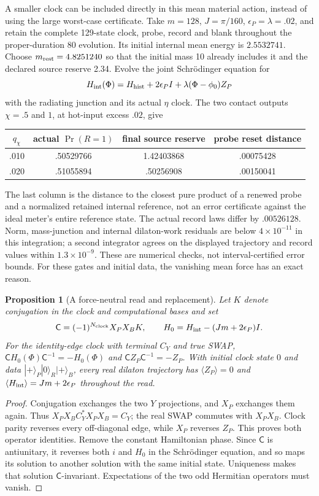 \documentclass[12pt,a4paper]{article}
\newtheorem{proposition}[theorem]{Proposition}
\begin{document}
A smaller clock can be included directly in this mean material action,
instead of using the large worst-case certificate. Take $m=128$,
$J=\pi/160$, $\epsilon_P=\lambda=.02$, and retain the complete
129-state clock, probe, record and blank throughout the proper-duration
80 evolution. Its initial internal mean energy is $2.5532741$.
Choose $m_{\rm rest}=4.8251240$ so that the initial mass 10 already
includes it and the declared source reserve 2.34. Evolve the joint
Schr\"odinger equation for
\[
 H_{\rm int}(\Phi)=H_{\rm hist}+2\epsilon_P I
                       +\lambda(\Phi-\phi_0)Z_P
\]
with the radiating junction and its actual $\eta$ clock. The two contact
outputs $\chi=.5$ and $1$, at hot-input excess $.02$, give
\begin{center}
\begin{tabular}{cccc}
\hline
$q_\chi$ & actual $\Pr(R=1)$ & final source reserve & probe reset distance\\
\hline
.010 & .50529766 & 1.42403868 & .00075428\\
.020 & .51055894 & .50256908 & .00150041\\
\hline
\end{tabular}
\end{center}
The last column is the distance to the closest pure product of a
renewed probe and a normalized retained internal reference, not an error
certificate against the ideal meter's entire reference state. The actual record
laws differ by $.00526128$. Norm, mass-junction and internal dilaton-work
residuals are below $4\times10^{-11}$ in this integration; a second
integrator agrees on the displayed trajectory and record values within
$1.3\times10^{-9}$. These are numerical checks, not interval-certified
error bounds. For these gates and initial data, the vanishing mean force
has an exact reason.

\begin{proposition}[A force-neutral read and replacement]
\label{prop:force-neutral-meter}
Let $K$ denote conjugation in the clock and computational bases and set
\[
 \mathsf C=(-1)^{N_{\rm clock}}X_PX_B K,\qquad
 H_0=H_{\rm int}-(Jm+2\epsilon_P)I.
\]
For the identity-edge clock with terminal $C_Y$ and true SWAP,
$\mathsf C H_0(\Phi)\mathsf C^{-1}=-H_0(\Phi)$ and
$\mathsf C Z_P\mathsf C^{-1}=-Z_P$.
With initial clock state $0$ and data $|+\rangle_P|0\rangle_R|+\rangle_B$,
every real dilaton trajectory has
$\langle Z_P\rangle=0$ and
$\langle H_{\rm int}\rangle=Jm+2\epsilon_P$ throughout the read.
\end{proposition}
\begin{proof}
Conjugation exchanges the two $Y$ projections, and $X_P$ exchanges
them again. Thus $X_PX_B C_Y^*X_PX_B=C_Y$; the real SWAP commutes
with $X_PX_B$. Clock parity reverses every off-diagonal edge, while
$X_P$ reverses $Z_P$. This proves both operator identities.
Remove the constant Hamiltonian phase. Since $\mathsf C$ is
antiunitary, it reverses both $i$ and $H_0$ in the Schr\"odinger
equation, and so maps its solution to another solution with the same
initial state. Uniqueness makes that solution $\mathsf C$-invariant.
Expectations of the two odd Hermitian operators must vanish.
\end{proof}
\end{document}
